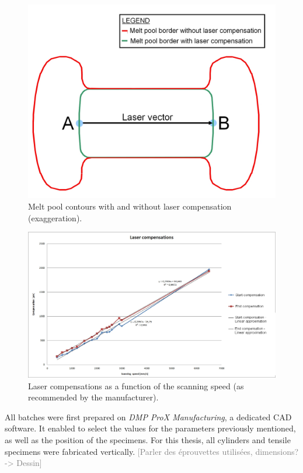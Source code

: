 \begin{figure}[ht]
\centering
\includegraphics[scale=0.3]{Images/Compens}
\decoRule
\caption[Melt pool contours with and without laser compensation (exaggeration)]{Melt pool contours with and without laser compensation (exaggeration).}
\label{fig:Compens}
\end{figure}

\begin{figure}[ht]
\centering
\includegraphics[scale=0.45]{Images/Compens1}
\decoRule
\caption[Laser compensations as a function of the scanning speed (as recommended by the manufacturer)]{Laser compensations as a function of the scanning speed (as recommended by the manufacturer).}
\label{fig:Compens1}
\end{figure}

All batches were first prepared on \textit{DMP ProX Manufacturing}, a dedicated CAD software. It enabled to select the values for the parameters previously mentioned, as well as the position of the specimens. For this thesis, all cylinders and tensile specimens were fabricated vertically. \textcolor{gray}{[Parler des éprouvettes utilisées, dimensions? -> Dessin]}\\

